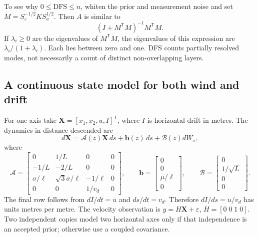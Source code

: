 \documentclass[11pt,a4paper]{article}
\numberwithin{equation}{section}
\begin{document}
To see why $0\leq\mathrm{DFS}\leq n$, whiten the prior and measurement noise and set $M=S_\varepsilon^{-1/2}KS_a^{1/2}$. Then $A$ is similar to
\begin{equation}
 (I+M^{\mathsf T}M)^{-1}M^{\mathsf T}M.
\end{equation}
If $\lambda_i\geq0$ are the eigenvalues of $M^{\mathsf T}M$, the eigenvalues of this expression are $\lambda_i/(1+\lambda_i)$. Each lies between zero and one. DFS counts partially resolved modes, not necessarily a count of distinct non-overlapping layers.

\subsection{A continuous state model for both wind and drift}
For one axis take $\mathbf X=[x_1,x_2,u,I]^{\mathsf T}$, where $I$ is horizontal drift in metres. The dynamics in distance descended are
\begin{equation}
 d\mathbf X=\mathcal A(z)\mathbf X\,ds+\mathbf b(z)\,ds+\mathcal B(z)dW_s,
\end{equation}
where
\begin{equation}
 \mathcal A=\begin{bmatrix}
 0&1/L&0&0\\
 -1/L&-2/L&0&0\\
 \sigma/\ell&\sqrt3\sigma/\ell&-1/\ell&0\\
 0&0&1/v_d&0
 \end{bmatrix},\qquad
 \mathbf b=\begin{bmatrix}0\\0\\\mu/\ell\\0\end{bmatrix},\qquad
 \mathcal B=\begin{bmatrix}0\\1/\sqrt L\\0\\0\end{bmatrix}.
\end{equation}
The final row follows from $dI/dt=u$ and $ds/dt=v_d$. Therefore $dI/ds=u/v_d$ has units metres per metre. The velocity observation is $y=H\mathbf X+\varepsilon$, $H=[0\;0\;1\;0]$. Two independent copies model two horizontal axes only if that independence is an accepted prior; otherwise use a coupled covariance.
\end{document}
